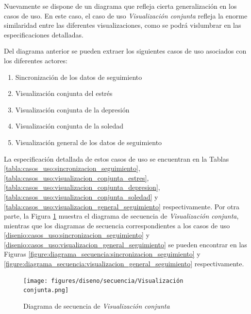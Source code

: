             Nuevamente se dispone de un diagrama que refleja cierta generalización en los casos de uso. En este caso, el caso de uso \textit{Visualización conjunta} refleja la enorme similaridad entre las diferentes visualizaciones, como se podrá vislumbrar en las especificaciones detalladas. 

            Del diagrama anterior se pueden extraer los siguientes casos de uso asociados con los diferentes actores:

            \begin{enumerate}[resume=casos-uso,label=\textbf{\texttt{CU-\arabic*}}]
                \item \label{disenio:casos_uso:sincronizacion_seguimiento} Sincronización de los datos de seguimiento
                \item \label{disenio:casos_uso:visualizacion_conjunta_estres} Visualización conjunta del estrés
                \item \label{disenio:casos_uso:visualizacion_conjunta_depresion} Visualización conjunta de la depresión
                \item \label{disenio:casos_uso:visualizacion_conjunta_soledad} Visualización conjunta de la soledad
                \item \label{disenio:casos_uso:visualizacion_general_seguimiento} Visualización general de los datos de seguimiento
            \end{enumerate}

            La especificación detallada de estos casos de uso se encuentran en la Tablas \ref{tabla:casos_uso:sincronizacion_seguimiento}, \ref{tabla:casos_uso:visualizacion_conjunta_estres}, \ref{tabla:casos_uso:visualizacion_conjunta_depresion}, \ref{tabla:casos_uso:visualizacion_conjunta_soledad} y \ref{tabla:casos_uso:visualizacion_general_seguimiento} respectivamente. Por otra parte, la Figura \ref{figure:diagrama_secuencia:visualizacion_conjunta} muestra el diagrama de secuencia de \textit{Visualización conjunta}, mientras que los diagramas de secuencia correspondientes a los casos de uso \ref{disenio:casos_uso:sincronizacion_seguimiento} y \ref{disenio:casos_uso:visualizacion_general_seguimiento} se pueden encontrar en las Figuras \ref{figure:diagrama_secuencia:sincronizacion_seguimiento} y  \ref{figure:diagrama_secuencia:visualizacion_general_seguimiento} respectivamente.

            \begin{figure}[h]
                \centering
                \texttt{[image: figures/diseno/secuencia/Visualización conjunta.png]}
                \caption{Diagrama de secuencia de \textit{Visualización conjunta}}
                \label{figure:diagrama_secuencia:visualizacion_conjunta}
            \end{figure}

